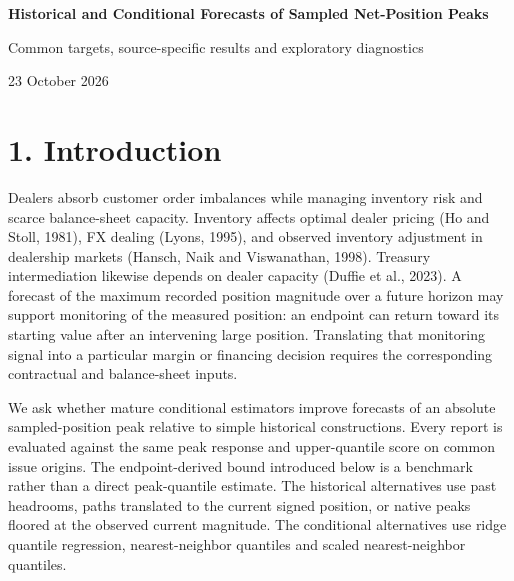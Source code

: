 \documentclass[10pt,a4paper]{article}
\begin{document}
\fontsize{10.5}{14}\selectfont
\begin{center}
{\LARGE\bfseries Historical and Conditional Forecasts of Sampled Net-Position Peaks}\par\vspace{8pt}
{\large Common targets, source-specific results and exploratory diagnostics}\par\vspace{6pt}
23 October 2026
\end{center}
\begin{abstract}
How well can a dealer forecast the largest absolute recorded net position before a reporting horizon ends? Such forecasts motivate evaluating a monitoring input for the measured position series. We compare historical peak constructions with ridge quantile regression and local quantiles on a market maker's FX client-flow series and a weekly Treasury-dealer aggregate. The common target includes the observed issue position and uses completed training labels. First, six-record FX regression lowers matched-history pinball loss by 14.77\%, while breaches rise from 360 to 376. Second, the Treasury primary deteriorates by 50.79\%, with breaches rising from 28 to 54. Third, lower pinball loss often accompanies more breach occasions. The evidence is specific to the inspected records, stipulated score and source-measurement conventions.
\end{abstract}
\section*{1. Introduction}
Dealers absorb customer order imbalances while managing inventory risk and scarce balance-sheet capacity. Inventory affects optimal dealer pricing (Ho and Stoll, 1981), FX dealing (Lyons, 1995), and observed inventory adjustment in dealership markets (Hansch, Naik and Viswanathan, 1998). Treasury intermediation likewise depends on dealer capacity (Duffie et al., 2023). A forecast of the maximum recorded position magnitude over a future horizon may support monitoring of the measured position: an endpoint can return toward its starting value after an intervening large position. Translating that monitoring signal into a particular margin or financing decision requires the corresponding contractual and balance-sheet inputs.

We ask whether mature conditional estimators improve forecasts of an absolute sampled-position peak relative to simple historical constructions. Every report is evaluated against the same peak response and upper-quantile score on common issue origins. The endpoint-derived bound introduced below is a benchmark rather than a direct peak-quantile estimate. The historical alternatives use past headrooms, paths translated to the current signed position, or native peaks floored at the observed current magnitude. The conditional alternatives use ridge quantile regression, nearest-neighbor quantiles and scaled nearest-neighbor quantiles.
\end{document}
